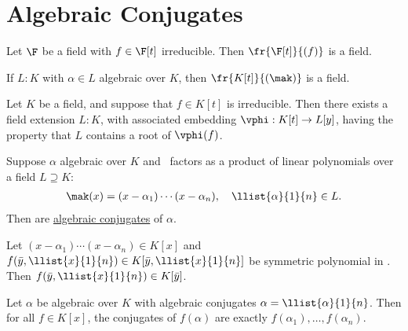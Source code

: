 \documentclass[a4paper]{article}
\begin{document}
\section{Algebraic Conjugates}

\begin{tlemma}
  Let \( \F \) be a field with \( f\in \F[t] \) irreducible.
  Then \( \fr{\F[t]}{(f)} \) is a field.
\end{tlemma}

\begin{tcorollary}
  If \( L:K \) with \( \alpha\in L \) algebraic over \( K \), then \( \fr{K[t]}{(\mak)} \) is a field.
\end{tcorollary}

\begin{ttheorem}
  Let \( K \) be a field, and suppose that \( f\in K[t] \) is irreducible.
  Then there exists a field extension \( L:K \), with associated embedding \( \vphi:K[t]\to L[y] \), having the property that \( L \) contains a root of \( \vphi(f) \).
\end{ttheorem}

\begin{tdefinition}
  Suppose \( \alpha \) algebraic over \( K \) and \mak~factors as a product of linear polynomials over a field \( L\supseteq K \): \begin{align*}
    \mak(x) = (x-\alpha_1)\cdots(x-\alpha_n),\quad \llist{\alpha}{1}{n}\in L.
  \end{align*}
  Then  are \ul{algebraic conjugates} of \( \alpha \).
\end{tdefinition}

\begin{tlemma}
  Let \( (x-\alpha_1)\cdots(x-\alpha_n)\in K[x] \) and \( f(\bar y,\llist{x}{1}{n})\in K[\bar y,\llist{x}{1}{n}] \) be symmetric polynomial in .
  Then \( f(\bar y,\llist{x}{1}{n}) \in K[\bar y] \).
\end{tlemma}

\begin{ttheorem}
  Let \( \alpha \) be algebraic over \( K \) with algebraic conjugates \( \alpha=\llist{\alpha}{1}{n} \).
  Then for all \( f\in K[x] \), the conjugates of \( f(\alpha) \) are exactly \( f(\alpha_1),\ldots,f(\alpha_n) \).
\end{ttheorem}
\end{document}

